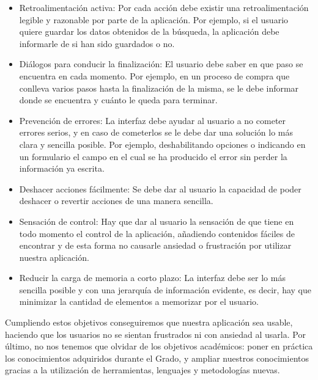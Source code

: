 \begin{itemize}
\begin{itemize}
		\item Retroalimentación activa: Por cada acción debe existir una retroalimentación legible y razonable por parte de la aplicación. Por ejemplo, si el usuario quiere guardar los datos obtenidos de la búsqueda, la aplicación debe informarle de si han sido guardados o no.
		\item Diálogos para conducir la finalización: El usuario debe saber en que paso se encuentra en cada momento. Por ejemplo, en un proceso de compra que conlleva varios pasos hasta la finalización de la misma, se le debe informar donde se encuentra y cuánto le queda para terminar.
		\item Prevención de errores: La interfaz debe ayudar al usuario a no cometer errores serios, y en caso de cometerlos se le debe dar una solución lo más clara y sencilla posible. Por ejemplo, deshabilitando opciones o indicando en un formulario el campo en el cual se ha producido el error sin perder la información ya escrita.
		\item Deshacer acciones fácilmente: Se debe dar al usuario la capacidad de poder deshacer o revertir acciones de una manera sencilla. 
		\item Sensación de control: Hay que dar al usuario la sensación de que tiene en todo momento el control de la aplicación, añadiendo contenidos fáciles de encontrar y de esta forma no causarle ansiedad o frustración por utilizar nuestra aplicación.
		\item Reducir la carga de memoria a corto plazo: La interfaz debe ser lo más sencilla posible y con una jerarquía de información evidente, es decir, hay que minimizar la cantidad de elementos a memorizar por el usuario.
	\end{itemize}
\end{itemize}
Cumpliendo estos objetivos conseguiremos que nuestra aplicación sea usable, haciendo que los usuarios no se sientan frustrados ni con ansiedad al usarla. 
Por último, no nos tenemos que olvidar de los objetivos académicos: poner en práctica los conocimientos adquiridos durante el Grado, y ampliar nuestros conocimientos gracias a la utilización de herramientas, lenguajes y metodologías nuevas.